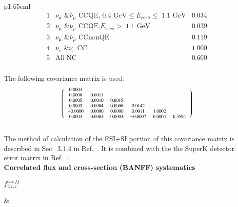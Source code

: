 {\begin{longtable}{p{1.65cm}l}
{$${\begin{array}{c|c|c}
            1 &  \nu_\mu \text{ \& } \bar{\nu}_{\mu} \text{ CCQE,} \text{ 0.4 GeV} \leq E_{reco} \leq \text{ 1.1 GeV}       & 0.034   \\
            2 &  \nu_\mu \text{ \& } \bar{\nu}_{\mu} \text{ CCQE,} E_{reco} > \text{ 1.1 GeV}                               & 0.039   \\
            3 &  \nu_\mu \text{ \& } \bar{\nu}_{\mu} \text{ CCnonQE}                                                        & 0.119   \\
            4 &  \nu_e \text{ \& } \bar{\nu}_{e} \text{ CC}                                                                 & 1.000   \\
            5 &  \text{All NC}                                                                                              & 0.600   \\
         \end{array} }
$$\\
    The following covariance matrix is used:\\
    $$     
     \scriptsize
     \left(
        {\begin{array}{cccccc}
             0.0004 &        &        &         &         &        \\
             0.0006 & 0.0011 &        &         &         &        \\
             0.0005 & 0.0010 & 0.0015 &         &         &        \\
             0.0003 & 0.0004 & 0.0006 &  0.0142 &         &        \\
            -0.0000 & 0.0000 & 0.0000 &  0.0011 &  1.0002 &        \\
             0.0003 & 0.0003 & 0.0003 & -0.0007 &  0.0004 & 0.3594 \\
         \end{array} }
     \right)
    $$\\
    The method of calculation of the FSI+SI portion of this covariance
    matrix is described in Sec.\ 3.1.4 in Ref.\
    \cite{OurRun123DisappAnalysis3Flavour}.
    It is combined with the the SuperK detector error matrix in Ref.\ \cite{SuperkErrors2013}.
    \vspace{0.2cm}
  }
\\
%
%
\hline
{} { {\bf Correlated flux and cross-section (BANFF) systematics} } \\
\hline
  \parbox{0.15\textwidth}
  {
     $f_{i; t, r}^{banff}$
  }
&
  \parbox{0.81\textwidth}
  {
    \vspace{0.2cm}
}
\end{longtable}}
